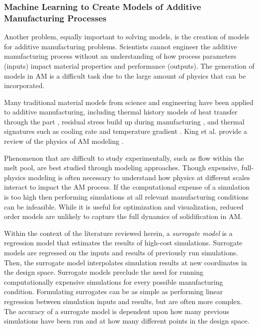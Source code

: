 \subsubsection{Machine Learning to Create Models of Additive Manufacturing Processes}
Another problem, equally important to solving models, is the creation of models for additive manufacturing problems. Scientists cannot engineer the additive manufacturing process without an understanding of how process parameters (inputs) impact material properties and performance (outputs). The generation of models in AM is a difficult task due to the large amount of physics that can be incorporated.

Many traditional material models from science and engineering have been applied to additive manufacturing, including thermal history models of heat transfer through the part \cite{Michaleris2014}, residual stress build up during manufacturing \cite{Pal2014, Ding2011}, and thermal signatures such as cooling rate and temperature gradient \cite{Li2014, Raghavan2016}. King et al. provide a review of the physics of AM modeling \cite{King2015a}. 

Phenomenon that are difficult to study experimentally, such as flow within the melt pool, are best studied through modeling approaches. Though expensive, full-physics modeling is often necessary to understand how physics at different scales interact to impact the AM process. If the computational expense of a simulation is too high then performing simulations at all relevant manufacturing conditions can be infeasible. While it is useful for optimization and visualization, reduced order models are unlikely to capture the full dynamics of solidification in AM. 

Within the context of the literature reviewed herein, a \textit{surrogate model} is a regression model that estimates the results of high-cost simulations. Surrogate models are regressed on the inputs and results of previously run simulations. Then, the surrogate model interpolates simulation results at new coordinates in the design space. Surrogate models preclude the need for running computationally expensive simulations for every possible manufacturing condition. Formulating surrogates can be as simple as performing linear regression between simulation inputs and results, but are often more complex. The accuracy of a surrogate model is dependent upon how many previous simulations have been run and at how many different points in the design space.

